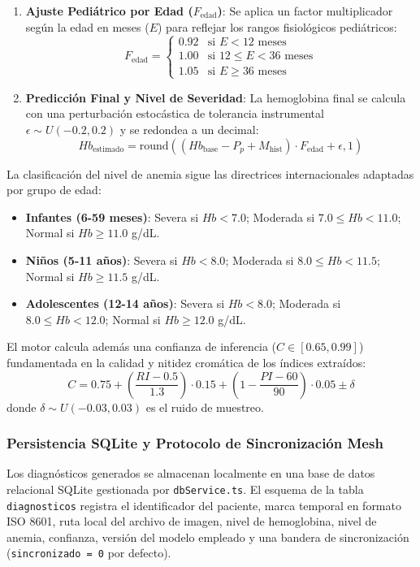 \begin{enumerate}
    \item \textbf{Ajuste Pediátrico por Edad ($F_{\text{edad}}$)}: Se aplica un factor multiplicador según la edad en meses ($E$) para reflejar los rangos fisiológicos pediátricos:
    \begin{equation}
        F_{\text{edad}} = \begin{cases} 
            0.92 & \text{si } E < 12 \text{ meses} \\
            1.00 & \text{si } 12 \le E < 36 \text{ meses} \\
            1.05 & \text{si } E \ge 36 \text{ meses}
        \end{cases}
    \end{equation}
    \item \textbf{Predicción Final y Nivel de Severidad}: La hemoglobina final se calcula con una perturbación estocástica de tolerancia instrumental $\epsilon \sim U(-0.2, 0.2)$ y se redondea a un decimal:
    \begin{equation}
        Hb_{\text{estimado}} = \text{round}\left( (Hb_{\text{base}} - P_p + M_{\text{hist}}) \cdot F_{\text{edad}} + \epsilon, 1 \right)
    \end{equation}
\end{enumerate}

La clasificación del nivel de anemia sigue las directrices internacionales adaptadas por grupo de edad:
\begin{itemize}
    \item \textbf{Infantes (6-59 meses)}: Severa si $Hb < 7.0$; Moderada si $7.0 \le Hb < 11.0$; Normal si $Hb \ge 11.0$ g/dL.
    \item \textbf{Niños (5-11 años)}: Severa si $Hb < 8.0$; Moderada si $8.0 \le Hb < 11.5$; Normal si $Hb \ge 11.5$ g/dL.
    \item \textbf{Adolescentes (12-14 años)}: Severa si $Hb < 8.0$; Moderada si $8.0 \le Hb < 12.0$; Normal si $Hb \ge 12.0$ g/dL.
\end{itemize}

El motor calcula además una confianza de inferencia ($C \in [0.65, 0.99]$) fundamentada en la calidad y nitidez cromática de los índices extraídos:
\begin{equation}
    C = 0.75 + \left(\frac{RI - 0.5}{1.3}\right)\cdot 0.15 + \left(1 - \frac{PI - 60}{90}\right)\cdot 0.05 \pm \delta
\end{equation}
donde $\delta \sim U(-0.03, 0.03)$ es el ruido de muestreo.

\subsubsection{Persistencia SQLite y Protocolo de Sincronización Mesh}
Los diagnósticos generados se almacenan localmente en una base de datos relacional SQLite gestionada por \texttt{dbService.ts}. El esquema de la tabla \texttt{diagnosticos} registra el identificador del paciente, marca temporal en formato ISO 8601, ruta local del archivo de imagen, nivel de hemoglobina, nivel de anemia, confianza, versión del modelo empleado y una bandera de sincronización (\texttt{sincronizado = 0} por defecto).

